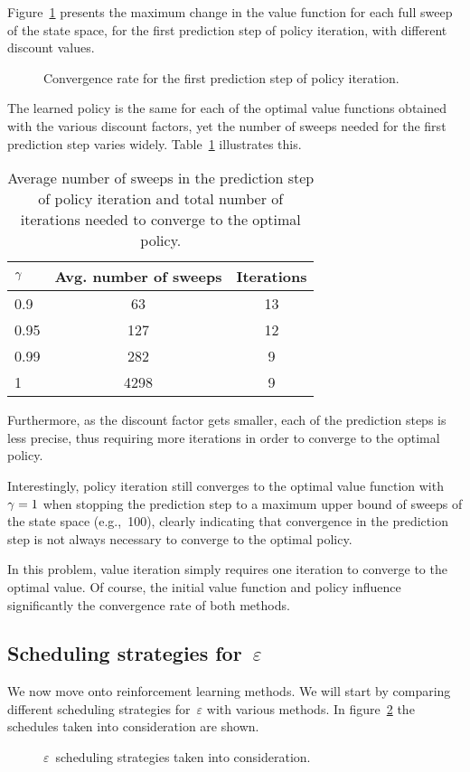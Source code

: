Figure~\ref{fig:pi_convergence} presents the maximum change in the value function for each full sweep of the state space, for the first prediction step of policy iteration, with different discount values.
\begin{figure}
\centering

\caption{Convergence rate for the first prediction step of policy iteration.}
\label{fig:pi_convergence}
\end{figure}
The learned policy is the same for each of the optimal value functions obtained with the various discount factors, yet the number of sweeps needed for the first prediction step varies widely. Table~\ref{tab:policy_iteration_convergence} illustrates this.
\begin{table}
\centering
\begin{tabular}{l c c}
\toprule
${\gamma}$ & Avg. number of sweeps & Iterations \\
\midrule
0.9 & 63 & 13 \\
0.95 & 127 & 12 \\
0.99 & 282 & 9 \\
1 & 4298 & 9 \\
\bottomrule
\end{tabular}
\caption{Average number of sweeps in the prediction step of policy iteration and total number of iterations needed to converge to the optimal policy.}
\label{tab:policy_iteration_convergence}
\end{table}
Furthermore, as the discount factor gets smaller, each of the prediction steps is less precise, thus requiring more iterations in order to converge to the optimal policy.

Interestingly, policy iteration still converges to the optimal value function with~${\gamma=1}$ when stopping the prediction step to a maximum upper bound of sweeps of the state space (e.g.,~100), clearly indicating that convergence in the prediction step is not always necessary to converge to the optimal policy.

In this problem, value iteration simply requires one iteration to converge to the optimal value. Of course, the initial value function and policy influence significantly the convergence rate of both methods.

\subsection{Scheduling strategies for~\texorpdfstring{${\varepsilon}$}{epsilon}}
We now move onto reinforcement learning methods. We will start by comparing different scheduling strategies for~${\varepsilon}$ with various methods. In figure~\ref{fig:epsilon_schedules} the schedules taken into consideration are shown.
\begin{figure}[ht]
\centering

\caption{${\varepsilon}$~scheduling strategies taken into consideration.}
\label{fig:epsilon_schedules}
\end{figure}

